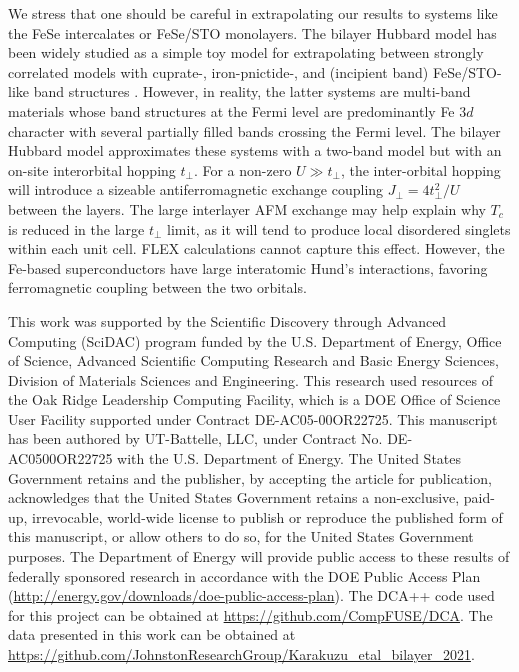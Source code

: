 \documentclass[prb,twocolumn,amsmath,amssymb,superscriptaddress,floatfix,nofootinbib]{revtex4-2}
\begin{document}
We stress that one should be careful in extrapolating our results to systems like the FeSe intercalates or FeSe/STO monolayers. The bilayer Hubbard model has been widely studied as a simple toy model for extrapolating between strongly correlated models with cuprate-, iron-pnictide-, and (incipient band) FeSe/STO-like band structures \cite{Maier2011, Mishra2016, Kuroki2008,  RademakerEnhanced2021, PelliciariRIXS2020}. However, in reality, the latter systems are multi-band materials whose band structures at the Fermi level are predominantly Fe $3d$ character with several partially filled bands crossing the Fermi level. The bilayer Hubbard model approximates these systems with a two-band model but with an on-site interorbital hopping $t_\perp$. For a non-zero $U \gg t_\perp$, the inter-orbital hopping will introduce a sizeable antiferromagnetic exchange coupling $J_\perp = 4t^2_\perp/U$ between the layers. The large interlayer AFM exchange may help explain why $T_c$ is reduced in the large $t_\perp$ limit, as it will tend to produce local disordered singlets within each unit cell. FLEX calculations cannot capture this effect. However, the Fe-based superconductors have large interatomic Hund's interactions, favoring ferromagnetic coupling between the two orbitals. 

\begin{acknowledgments}
This work was supported by the Scientific Discovery through Advanced Computing (SciDAC) program funded by the U.S. Department of Energy, Office of Science, Advanced Scientific Computing Research and Basic Energy Sciences, Division of Materials Sciences and Engineering. This research used resources of the Oak Ridge Leadership Computing Facility, which is a DOE Office of Science User Facility supported under Contract DE-AC05-00OR22725. This manuscript has been authored by UT-Battelle, LLC, under Contract No. DE-AC0500OR22725 with the U.S. Department of Energy. The United States Government retains and the publisher, by accepting the article for publication, acknowledges that the United States Government retains a non-exclusive, paid-up, irrevocable, world-wide license to publish or reproduce the published form of this manuscript, or allow others to do so, for the United States Government purposes. The Department of Energy will provide public access to these results of federally sponsored research in accordance with the DOE Public Access Plan (\url{http://energy.gov/downloads/doe-public-access-plan}). The DCA++ code used for this project can be obtained at \url{https://github.com/CompFUSE/DCA}. The data presented in this work can be obtained at \url{https://github.com/JohnstonResearchGroup/Karakuzu_etal_bilayer_2021}. 
\end{acknowledgments}
\end{document}
